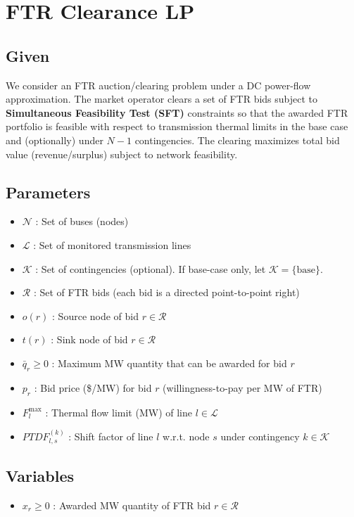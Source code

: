 \documentclass[11pt]{article}
\begin{document}
\section{FTR Clearance LP}
\subsection{Given}
We consider an FTR auction/clearing problem under a DC power-flow approximation.
The market operator clears a set of FTR bids subject to \textbf{Simultaneous Feasibility Test (SFT)}
constraints so that the awarded FTR portfolio is feasible with respect to transmission thermal limits
in the base case and (optionally) under $N\!-\!1$ contingencies. The clearing maximizes total bid value
(revenue/surplus) subject to network feasibility.

\subsection {Parameters}
\begin{itemize}
  \item $\mathcal{N}$ : Set of buses (nodes)
  \item $\mathcal{L}$ : Set of monitored transmission lines
  \item $\mathcal{K}$ : Set of contingencies (optional). If base-case only, let $\mathcal{K}=\{\text{base}\}$.
  \item $\mathcal{R}$ : Set of FTR bids (each bid is a directed point-to-point right)
  \item $o(r)$ : Source node of bid $r\in\mathcal{R}$
  \item $t(r)$ : Sink node of bid $r\in\mathcal{R}$
  \item $\bar q_r \ge 0$ : Maximum MW quantity that can be awarded for bid $r$
  \item $p_r$ : Bid price (\$/MW) for bid $r$ (willingness-to-pay per MW of FTR)
  \item $F_l^{\max}$ : Thermal flow limit (MW) of line $l\in\mathcal{L}$
  \item $PTDF^{(k)}_{l,s}$ : Shift factor of line $l$ w.r.t. node $s$ under contingency $k\in\mathcal{K}$

\end{itemize}

\subsection{Variables}
\begin{itemize}
  \item $x_r \ge 0$ : Awarded MW quantity of FTR bid $r\in\mathcal{R}$
\end{itemize}
\end{document}
